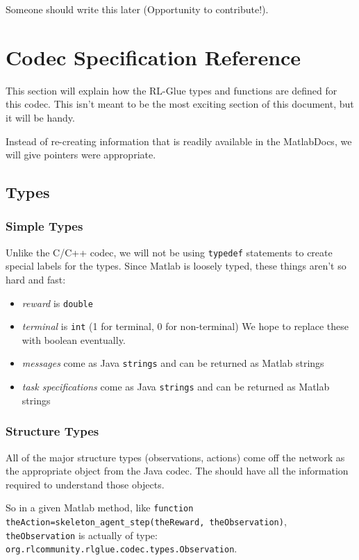 \documentclass[11pt]{article}
\begin{document}
Someone should write this later (Opportunity to contribute!).

\section{Codec Specification Reference}
This section will explain how the RL-Glue types and functions are defined for this codec.  This isn't meant to be the most exciting section of this document, but it will
be handy.

Instead of re-creating information that is readily available in the MatlabDocs, we will give pointers were appropriate.

\subsection{Types}


\subsubsection{Simple Types}
Unlike the C/C++ codec, we will not be using \texttt{typedef} statements to create special labels for the types. Since Matlab is loosely typed, these things aren't so hard and 
fast:
\begin{itemize}
	\item \textit{reward} is \texttt{double}
	\item \textit{terminal} is \texttt{int} (1 for terminal, 0 for non-terminal) We hope to replace these with boolean eventually.
	\item \textit{messages} come as Java \texttt{strings} and can be returned as Matlab strings
	\item \textit{task specifications} come as Java \texttt{strings} and can be returned as Matlab strings
\end{itemize}

\def\rat{RL\_Abstract\_Type}

\subsubsection{Structure Types}
\label{sec:structure-types}
All of the major structure types (observations, actions) come off the network as the appropriate object from the Java codec.
The  should have all the information required to understand those objects.

So in a given Matlab method, like \newline
\texttt{function theAction=skeleton\_agent\_step(theReward, theObservation)}, 
\texttt{theObservation} is actually of type: \texttt{org.rlcommunity.rlglue.codec.types.Observation}.
\end{document}
